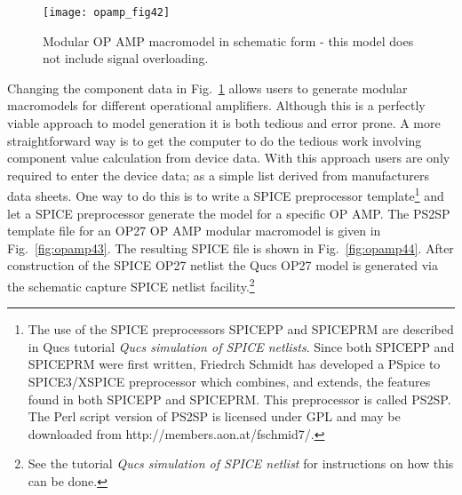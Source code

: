\begin{figure} 
  \centering
  \texttt{[image: opamp\_fig42]}
  \caption{Modular OP AMP macromodel in schematic form - this model does not include signal overloading. } 
  \label{fig:opamp42}
\end{figure}

Changing the component data in Fig.~\ref{fig:opamp42} allows users to generate modular macromodels for different operational amplifiers.  Although this is a perfectly viable approach to model generation it is both tedious and error prone. A more straightforward way is to get the computer to do the tedious work involving component value calculation from device data. With this approach users are only required to enter the device data; as a simple list derived from manufacturers data sheets. One way to do this is to write a SPICE preprocessor template\footnote{The use of the SPICE preprocessors SPICEPP and SPICEPRM are described in Qucs tutorial \textit{Qucs simulation of SPICE netlists}.  Since both SPICEPP and SPICEPRM were first written, Friedrch Schmidt has developed a PSpice to SPICE3/XSPICE preprocessor which combines, and extends, the features found in both SPICEPP and SPICEPRM. This preprocessor is called PS2SP. The Perl script version of PS2SP is licensed under GPL and may be downloaded from http://members.aon.at/fschmid7/. } and let a SPICE preprocessor generate the model for a specific OP AMP. The PS2SP template file for an OP27 OP AMP modular macromodel is given in Fig.~\ref{fig:opamp43}.  The resulting SPICE file is shown in Fig.~\ref{fig:opamp44}. After construction of the SPICE OP27 netlist the Qucs OP27 model is generated via the schematic capture SPICE netlist facility.\footnote{See the tutorial \textit{Qucs simulation of SPICE netlist} for instructions on how this can be done. }


